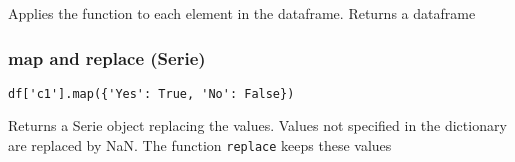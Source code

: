 \documentclass[french]{article}
\begin{document}
Applies the function to each element in the dataframe. Returns a dataframe

\subsubsection{map and replace (Serie)}
\begin{verbatim}
df['c1'].map({'Yes': True, 'No': False})
\end{verbatim}
Returns a Serie object replacing the values. Values not specified in the dictionary are replaced by NaN. The function \verb|replace| keeps these values
\end{document}

